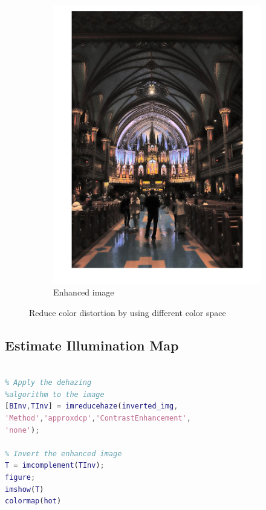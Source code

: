 \documentclass[conference]{IEEEtran}
\begin{document}
\begin{figure}[h!]
\begin{subfigure}[b]{0.4\linewidth}
\includegraphics[width=\linewidth]{images/img29.jpg}
\caption{Enhanced image}
\end{subfigure}
\caption{Reduce color distortion by using different color space}
\label{fig:Lab}
\end{figure}

\subsection{Estimate Illumination Map}

\begin{lstlisting}[language=Matlab]

% Apply the dehazing 
%algorithm to the image
[BInv,TInv] = imreducehaze(inverted_img,
'Method','approxdcp','ContrastEnhancement', 
'none');

% Invert the enhanced image
T = imcomplement(TInv);
figure;
imshow(T)
colormap(hot)

\end{lstlisting}
\end{document}
